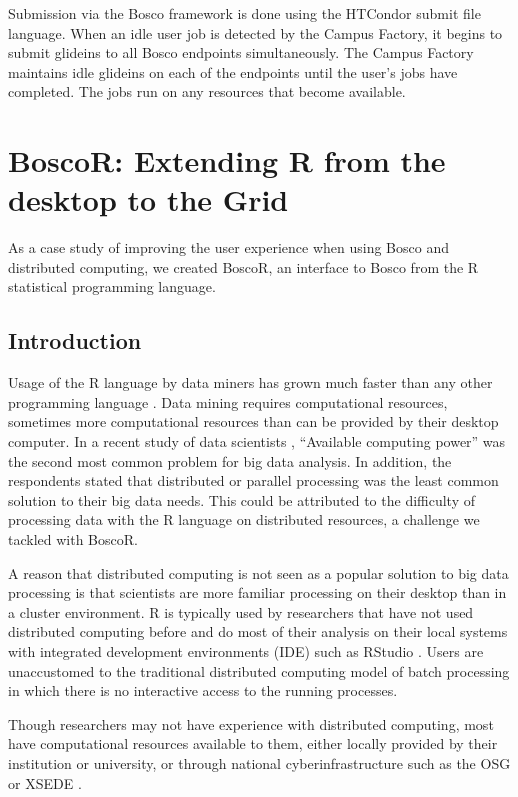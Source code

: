 Submission via the Bosco framework is done using the HTCondor submit file language.  When an idle user job is detected by the Campus Factory, it begins to submit glideins to all Bosco endpoints simultaneously.  The Campus Factory maintains idle glideins on each of the endpoints until the user's jobs have completed.  The jobs run on any resources that become available.


\section{BoscoR: Extending R from the desktop to the Grid}

As a case study of improving the user experience when using Bosco and distributed computing, we created BoscoR, an interface to Bosco from the R statistical programming language.  %


\subsection{Introduction}
Usage of the R language \cite{team2012r} by data miners has grown much faster than any other programming language \cite{rexer2013, KDnuggets2013}.  Data mining requires computational resources, sometimes more computational resources than can be provided by their desktop computer.  In a recent study of data scientists \cite{rexer2013}, ``Available computing power'' was the second most common problem for big data analysis.  In addition, the respondents stated that distributed or parallel processing was the least common solution to their big data needs.  This could be attributed to the difficulty of processing data with the R language on distributed resources, a challenge we tackled with BoscoR.

A reason that distributed computing is not seen as a popular solution to big data processing is that scientists are more familiar processing on their desktop than in a cluster environment.  R is typically used by researchers that have not used distributed computing before and do most of their analysis on their local systems with integrated development environments (IDE) such as RStudio \cite{racine2012rstudio}.  Users are unaccustomed to the traditional distributed computing model of batch processing in which there is no interactive access to the running processes.

Though researchers may not have experience with distributed computing, most have computational resources available to them, either locally provided by their institution or university, or through national cyberinfrastructure such as the OSG \cite{pordes2007open} or XSEDE \cite{xsede}.



